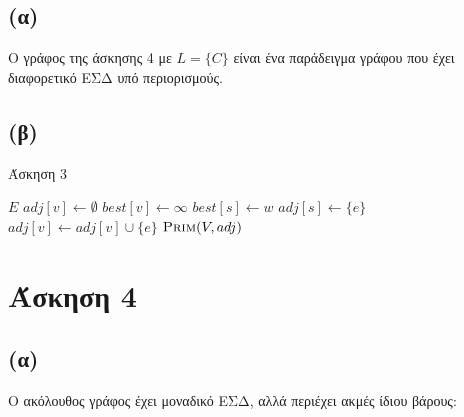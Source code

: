 \documentclass[11pt,a4paper]{book}
\begin{document}
\subsection*{(α)}
Ο γράφος της άσκησης 4 με $L = \{ C \}$ είναι ένα παράδειγμα γράφου που έχει διαφορετικό ΕΣΔ υπό περιορισμούς.

\subsection*{(β)}
\begin{algorithm}[H]
\caption{\textgreek{Άσκηση 3}}
\begin{algorithmic}[1]

	    \State \Return $E$
	\EndIf
        \State $adj[ v ] \gets \emptyset$
        \State $best[ v ] \gets \infty$
    \EndFor
            		    \State $best[ s ] \gets w$
        	    	    \State $adj[ s ] \gets \{ e \}$
	    	        \EndIf
    	        \EndIf
        	\EndFor
        \Else
            \State $adj[ v ] \gets adj[ v ] \cup \{ e \}$
        \EndIf
    \EndFor
    \State \Return $\Call{Prim}{V, adj}$
\EndProcedure
\end{algorithmic}
\end{algorithm}

\section*{Άσκηση 4}
\subsection*{(α)}

Ο ακόλουθος γράφος έχει μοναδικό ΕΣΔ, αλλά περιέχει ακμές ίδιου βάρους:

\begin{figure}[ht]
	\centering
\end{figure}
\end{document}
